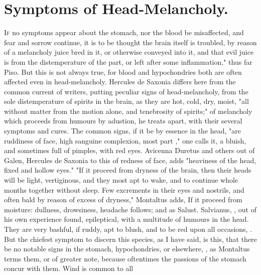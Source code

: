 {%
\section{Symptoms of Head-Melancholy.}

\lettrine[ante="]{I}{f} no symptoms appear about the stomach, nor
the blood be misaffected, and fear and sorrow continue, it is to be thought the
brain itself is troubled, by reason of a melancholy juice bred in it, or
otherwise conveyed into it, and that evil juice is from the distemperature of
the part, or left after some inflammation," thus far Piso. But this is not
always true, for blood and hypochondries both are often affected even in
head-melancholy. Hercules de Saxonia differs here from the
common current of writers, putting peculiar signs of head-melancholy, from the
sole distemperature of spirits in the brain, as they are hot, cold, dry, moist,
"all without matter from the motion alone, and tenebrosity of spirits;" of
melancholy which proceeds from humours by adustion, he treats apart, with their
several symptoms and cures. The common signs, if it be by essence in the head,
"are ruddiness of face, high sanguine complexion, most part ," one calls it, a bluish, and sometimes full of
pimples, with red eyes. Avicenna  Duretus and others out of Galen,  Hercules de Saxonia to this of redness of face,
adds "heaviness of the head, fixed and hollow eyes." "If
it proceed from dryness of the brain, then their heads will be light,
vertiginous, and they most apt to wake, and to continue whole months together
without sleep. Few excrements in their eyes and nostrils, and often bald by
reason of excess of dryness," Montaltus adds,  If
it proceed from moisture: dullness, drowsiness, headache follows; and as
Salust. Salvianus, , out of his own experience
found, epileptical, with a multitude of humours in the head. They are very
bashful, if ruddy, apt to blush, and to be red upon all occasions,
. But the chiefest symptom to discern this
species, as I have said, is this, that there be no notable signs in the
stomach, hypochondries, or elsewhere, , as
Montaltus terms them, or of greater note, because
oftentimes the passions of the stomach concur with them. Wind is common to all
}
